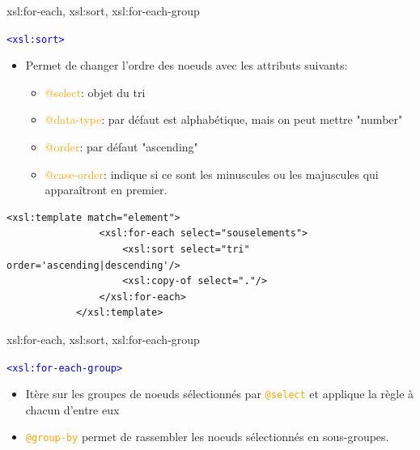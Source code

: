 \begin{frame}[fragile]{xsl:for-each, xsl:sort, xsl:for-each-group}
    \begin{block}{\textcolor{blue}{\texttt{<xsl:sort>}}}
        \begin{itemize}
            \item Permet de changer l'ordre des noeuds avec les attributs suivants:
            \begin{itemize}
                \item \textcolor{orange}{@select}: objet du tri
                \item \textcolor{orange}{@data-type}: par défaut est alphabétique, mais on peut mettre "number"
                \item \textcolor{orange}{@order}: par défaut "ascending"
                \item \textcolor{orange}{@case-order}: indique si ce sont les minuscules ou les majuscules qui apparaîtront en premier.
            \end{itemize}
        \end{itemize}
        \begin{lstlisting}[numbers=none]
            <xsl:template match="element">
                <xsl:for-each select="souselements">
                    <xsl:sort select="tri" order='ascending|descending'/>
                    <xsl:copy-of select="."/>
                </xsl:for-each>
            </xsl:template>
        \end{lstlisting}
    \end{block}
\end{frame}

\begin{frame}[fragile]{xsl:for-each, xsl:sort, xsl:for-each-group}
    \begin{block}{\textcolor{blue}{\texttt{<xsl:for-each-group>}}}
        \begin{itemize}
            \item Itère sur les groupes de noeuds sélectionnés par \textcolor{orange}{\texttt{@select}} et applique la règle à chacun d'entre eux
            \item \textcolor{orange}{\texttt{@group-by}} permet de rassembler les noeuds sélectionnés en sous-groupes.
        \end{itemize}
        
    \end{block}
\end{frame}

